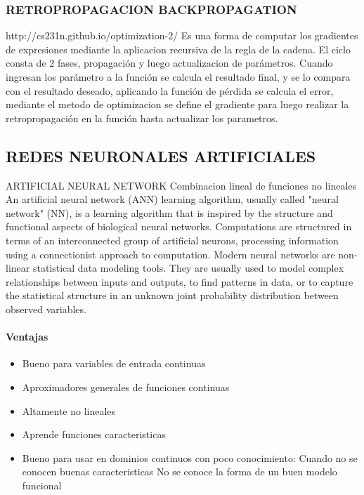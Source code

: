 \documentclass[a4paper,10pt]{article}
\begin{document}
    \subsubsection{RETROPROPAGACION BACKPROPAGATION}
      http://cs231n.github.io/optimization-2/
      Es una forma  de computar los gradientes de expresiones mediante la aplicacion recursiva de la regla de la cadena.
      El ciclo consta de 2 fases, propagación y luego actualizacion de parámetros. Cuando ingresan los parámetro a la función se calcula el resultado final, y se lo compara con el resultado 
      deseado, aplicando la función de pérdida se calcula el error, mediante el metodo de optimizacion se define el gradiente para luego realizar la retropropagación en la función hasta 
      actualizar los parametros.

    \subsection{REDES NEURONALES ARTIFICIALES}
      ARTIFICIAL NEURAL NETWORK
      Combinacion lineal de funciones no lineales
      An artificial neural network (ANN) learning algorithm, usually called "neural network" (NN), is a learning algorithm that is inspired by the structure and functional aspects 
      of biological neural networks. Computations are structured in terms of an interconnected group of artificial neurons, processing information using a connectionist approach 
      to computation. Modern neural networks are non-linear statistical data modeling tools. They are usually used to model complex relationships between inputs and outputs, 
      to find patterns in data, or to capture the statistical structure in an unknown joint probability distribution between observed variables.
      \paragraph {Ventajas}
	\begin{itemize}
	  \item Bueno para variables de entrada continuas
	  \item Aproximadores generales de funciones continuas
	  \item Altamente no lineales
	  \item Aprende funciones caracteristicas
	  \item Bueno para usar en dominios continuos con poco conocimiento:
	    \subitem Cuando no se conocen buenas caracteristicas
	    \subitem No se conoce la forma de un buen modelo funcional
	\end{itemize}
\end{document}
